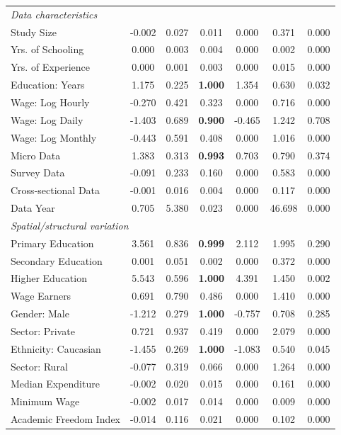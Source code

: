 {\begin{singlespace}
\begin{notsotiny}
\begin{longtable}{
@{\hskip\tabcolsep\extracolsep\fill}
l
*{6}{c}
}
\multicolumn{7}{l}{\emph{Data characteristics}}\\	
    Study Size & -0.002 & 0.027 & 0.011 & 0.000 & 0.371 & 0.000 \\
    Yrs. of Schooling & 0.000 & 0.003 & 0.004 & 0.000 & 0.002 & 0.000 \\
    Yrs. of Experience & 0.000 & 0.001 & 0.003 & 0.000 & 0.015 & 0.000 \\
    Education: Years & 1.175 & 0.225 & \textbf{1.000} & 1.354 & 0.630 & 0.032 \\
    Wage: Log Hourly & -0.270 & 0.421 & 0.323 & 0.000 & 0.716 & 0.000 \\
    Wage: Log Daily & -1.403 & 0.689 & \textbf{0.900} & -0.465 & 1.242 & 0.708 \\
    Wage: Log Monthly & -0.443 & 0.591 & 0.408 & 0.000 & 1.016 & 0.000 \\
    Micro Data & 1.383 & 0.313 & \textbf{0.993} & 0.703 & 0.790 & 0.374 \\
    Survey Data & -0.091 & 0.233 & 0.160 & 0.000 & 0.583 & 0.000 \\
    Cross-sectional Data & -0.001 & 0.016 & 0.004 & 0.000 & 0.117 & 0.000 \\
    Data Year & 0.705 & 5.380 & 0.023 & 0.000 & 46.698 & 0.000 \\
    \midrule
    
\multicolumn{7}{l}{\emph{Spatial/structural variation}}\\
    Primary Education & 3.561 & 0.836 & \textbf{0.999} & 2.112 & 1.995 & 0.290 \\
    Secondary Education & 0.001 & 0.051 & 0.002 & 0.000 & 0.372 & 0.000 \\
    Higher Education & 5.543 & 0.596 & \textbf{1.000} & 4.391 & 1.450 & 0.002 \\
    Wage Earners & 0.691 & 0.790 & 0.486 & 0.000 & 1.410 & 0.000 \\
    Gender: Male & -1.212 & 0.279 & \textbf{1.000} & -0.757 & 0.708 & 0.285 \\
    Sector: Private & 0.721 & 0.937 & 0.419 & 0.000 & 2.079 & 0.000 \\
    Ethnicity: Caucasian & -1.455 & 0.269 & \textbf{1.000} & -1.083 & 0.540 & 0.045 \\
    Sector: Rural & -0.077 & 0.319 & 0.066 & 0.000 & 1.264 & 0.000 \\
    Median Expenditure & -0.002 & 0.020 & 0.015 & 0.000 & 0.161 & 0.000 \\
    Minimum Wage & -0.002 & 0.017 & 0.014 & 0.000 & 0.009 & 0.000 \\
    Academic Freedom Index & -0.014 & 0.116 & 0.021 & 0.000 & 0.102 & 0.000 \\
    \midrule
    

\end{longtable}
\end{notsotiny}
\end{singlespace}}
